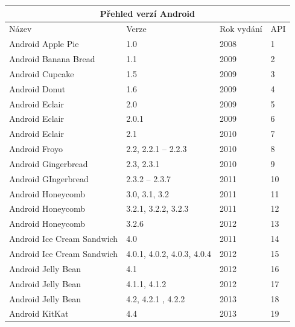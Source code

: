 \documentclass{vskpou} %
\begin{document}
\begin{center}

\begin{tabular}{ |p{3cm}|p{3cm}|p{3cm}|p{3cm}| }

\hline
\multicolumn{4}{|c|}{Přehled verzí Android} \\
\hline
Název& Verze &Rok vydání&API \\
\hline
Android Apple Pie & 1.0 & 2008 & 1\\
\hline
Android Banana Bread &
1.1&
2009&
2\\
\hline
Android Cupcake&
1.5&
2009&
3 \\
\hline
Android Donut&
1.6&
2009&
4\\
\hline
Android Eclair&
2.0&
2009&
5 \\
\hline
Android Eclair&
2.0.1&
2009&
6 \\
\hline
Android Eclair&
2.1&
2010&
7 \\
\hline
Android Froyo&
2.2, 2.2.1 – 2.2.3&
2010&
8 \\

\hline
Android Gingerbread&
2.3, 2.3.1&
2010&
9 \\
\hline
Android GIngerbread&
2.3.2 – 2.3.7&
2011&
10 \\
\hline
Android Honeycomb&
3.0, 3.1, 3.2&
2011&
11 \\
\hline
Android Honeycomb&
3.2.1, 3.2.2, 3.2.3&
2011&
12 \\
\hline
Android Honeycomb&
3.2.6&
2012&
13 \\
\hline
Android Ice Cream Sandwich&
4.0&
2011&
14 \\
\hline
Android Ice Cream Sandwich&
4.0.1, 4.0.2, 4.0.3, 4.0.4&
2012&
15 \\
\hline
Android Jelly Bean&
4.1&
2012&
16 \\
\hline
Android Jelly Bean&
4.1.1, 4.1.2&
2012&
17 \\
\hline
Android Jelly Bean&
4.2, 4.2.1 , 4.2.2&
2013&
18 \\
\hline
Android KitKat&
4.4&
2013&
19 \\
\hline





\end{tabular}

\end{center}
\end{document}
